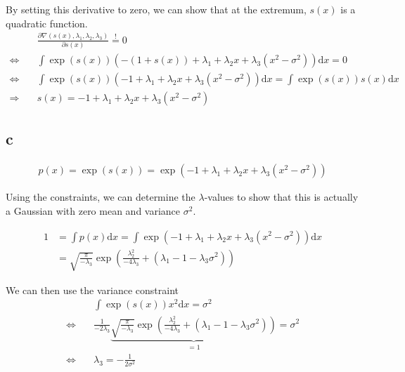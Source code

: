 By setting this derivative to zero, we can show that at the extremum, $s(x)$ is a  quadratic function.
\begin{align*}
&\frac{\partial \nabla(s(x), \lambda_1, \lambda_2, \lambda_3)}{\partial s(x)}  \overset{!}{=} 0\\
\Leftrightarrow \quad & \int \exp(s(x))\left(-(1 + s(x)) + \lambda_1 + \lambda_2 x + \lambda_3 (x^2 - \sigma^2) \right)\mathrm{d}x = 0\\
\Leftrightarrow \quad & \int \exp(s(x)) \left( -1 + \lambda_1 + \lambda_2 x + \lambda_3 (x^2 - \sigma^2) \right)\mathrm{d}x = \int \exp(s(x))s(x)\mathrm{d}x\\
\Rightarrow \quad & s(x) = -1 + \lambda_1 + \lambda_2 x + \lambda_3 (x^2 - \sigma^2)
\end{align*}

\subsection*{c}
\begin{align}
p(x) = \exp(s(x)) = \exp(-1 + \lambda_1 + \lambda_2 x + \lambda_3 (x^2 - \sigma^2))
\end{align}

Using the constraints, we can determine the $\lambda$-values to show that this is actually a Gaussian with zero mean and variance $\sigma^2$.

\begin{align*}
1 &= \int p(x)\mathrm{d}x =  \int \exp(-1 + \lambda_1 + \lambda_2 x + \lambda_3 (x^2 - \sigma^2)) \mathrm{d}x\\
&= \sqrt{\frac{\pi}{-\lambda_3}}\exp\left(\frac{\lambda_2^2}{-4\lambda_3}+(\lambda_1-1 - \lambda_3\sigma^2)\right)
\end{align*}

We can then use the variance constraint
\begin{align*}
& \int \exp(s(x)) x^2 \mathrm{d}x = \sigma^2\\
\Leftrightarrow \quad & \frac{1}{-2\lambda_3}\underbrace{ \sqrt{\frac{\pi}{-\lambda_3}}\exp\left(\frac{\lambda_2^2}{-4\lambda_3}+(\lambda_1-1- \lambda_3\sigma^2)\right)}_{=1} = \sigma^2\\
\Leftrightarrow \quad & \lambda_3 = -\frac{1}{2\sigma^2}
\end{align*}


